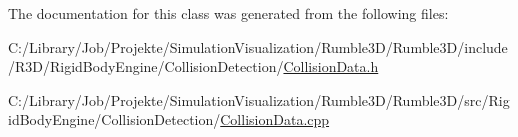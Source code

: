The documentation for this class was generated from the following files\+:\begin{DoxyCompactItemize}
\item 
C\+:/\+Library/\+Job/\+Projekte/\+Simulation\+Visualization/\+Rumble3\+D/\+Rumble3\+D/include/\+R3\+D/\+Rigid\+Body\+Engine/\+Collision\+Detection/\mbox{\hyperlink{_collision_data_8h}{Collision\+Data.\+h}}\item 
C\+:/\+Library/\+Job/\+Projekte/\+Simulation\+Visualization/\+Rumble3\+D/\+Rumble3\+D/src/\+Rigid\+Body\+Engine/\+Collision\+Detection/\mbox{\hyperlink{_collision_data_8cpp}{Collision\+Data.\+cpp}}\end{DoxyCompactItemize}
